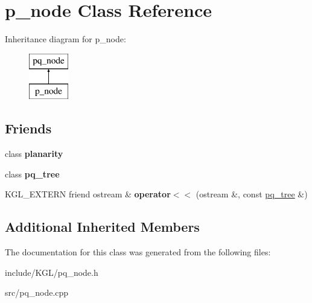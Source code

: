 \hypertarget{classp__node}{}\section{p\+\_\+node Class Reference}
\label{classp__node}
Inheritance diagram for p\+\_\+node\+:\begin{figure}[H]
\begin{center}
\leavevmode
\includegraphics[height=2.000000cm]{classp__node}
\end{center}
\end{figure}
\subsection*{Friends}
\begin{DoxyCompactItemize}
\item 
\mbox{\label{classp__node_ab6a02224dbc06343d95919289aec77c8}} 
class {\bfseries planarity}
\item 
\mbox{\label{classp__node_a0a5be4bb438c891059fae98f607f2a9c}} 
class {\bfseries pq\+\_\+tree}
\item 
\mbox{\label{classp__node_a2e8bee8ed51cc9d2567b69099c4d7cca}} 
K\+G\+L\+\_\+\+E\+X\+T\+E\+RN friend ostream \& {\bfseries operator$<$$<$} (ostream \&, const \mbox{\hyperlink{classpq__tree}{pq\+\_\+tree}} \&)
\end{DoxyCompactItemize}
\subsection*{Additional Inherited Members}


The documentation for this class was generated from the following files\+:\begin{DoxyCompactItemize}
\item 
include/\+K\+G\+L/pq\+\_\+node.\+h\item 
src/pq\+\_\+node.\+cpp\end{DoxyCompactItemize}
